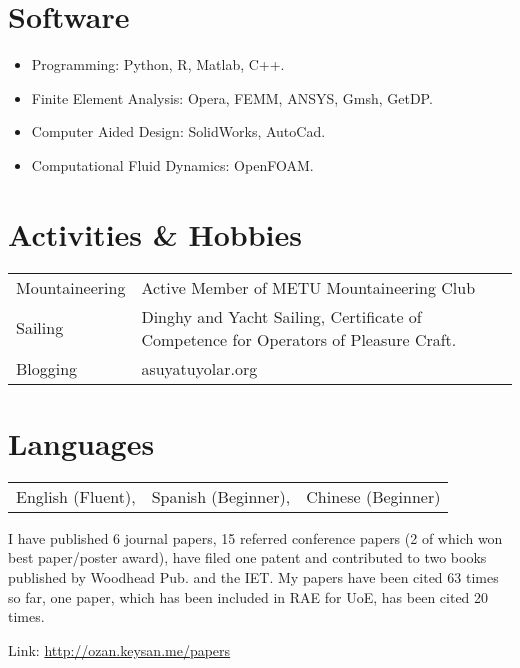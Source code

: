 \documentclass[a4paper,12pt]{article}
\begin{document}
\section{Software}
\begin{itemize}
\item Programming: Python, R, Matlab, C++.
\item Finite Element Analysis: Opera, FEMM, ANSYS, Gmsh, GetDP.
\item Computer Aided Design: SolidWorks, AutoCad.
\item Computational Fluid Dynamics: OpenFOAM.
\end{itemize}

\section{Activities \& Hobbies}
\begin{tabular}{ll}
Mountaineering & Active Member of METU Mountaineering Club\\
Sailing & Dinghy and Yacht Sailing, Certificate of Competence for Operators of Pleasure Craft. \\
Blogging & asuyatuyolar.org\\
\end{tabular}

\section{Languages}
\begin{tabular}{lll} 
English (Fluent), & Spanish (Beginner), & Chinese (Beginner)
\end{tabular}


\begin{publications}

I have published 6 journal papers, 15 referred conference papers (2 of which won best paper/poster award), have filed one patent and contributed to two books published by Woodhead Pub. and the IET. My papers have been cited 63 times so far, one paper, which has been included in RAE for UoE, has been cited 20 times.

Link: \url{http://ozan.keysan.me/papers}

\end{publications}


\end{document}
